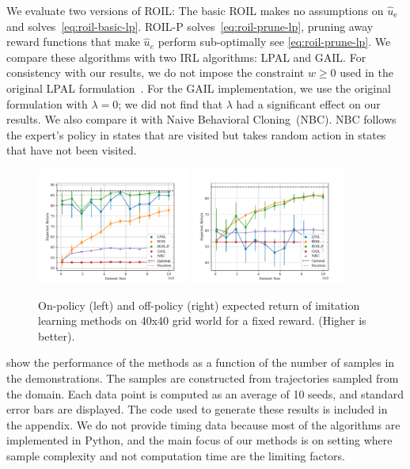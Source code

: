 \documentclass[10pt]{article}
\renewcommand{\cite}{\citep}
\theoremstyle{plain}
\theoremstyle{remark}
\begin{document}

We evaluate two versions of ROIL: The basic ROIL makes no assumptions on $\hat{u}_{\mathrm{e}}$ and solves~\eqref{eq:roil-basic-lp}. ROIL-P solves~\eqref{eq:roil-prune-lp}, pruning away reward functions that make $\hat{u}_e$ perform sub-optimally see \cref{eq:roil-prune-lp}. We compare these algorithms with two IRL algorithms: LPAL and GAIL. For consistency with our results, we do not impose the constraint $w \ge 0$ used in the original LPAL formulation~\cite{Syed2008}. For the GAIL implementation, we use the original formulation with $\lambda = 0$; we did not find that $\lambda$ had a significant effect on our results. We also compare it with Naive Behavioral Cloning~(NBC). NBC follows the expert's policy in states that are visited but takes random action in states that have not been visited.

\begin{figure}
\centering \includegraphics[width=0.45\textwidth]{../src/plots/returns/40x40_gridworld_on_policy_returns.pdf} \includegraphics[width=0.45\textwidth]{../src/plots/returns/40x40_gridworld_off_policy_returns.pdf}
\caption{On-policy (left) and off-policy (right) expected return of imitation learning methods on 40x40 grid world for a fixed reward. (Higher is better).}
\label{fig:grid-40}
\end{figure}

 show the performance of the methods as a function of the number of samples in the demonstrations. The samples are constructed from trajectories sampled from the domain. Each data point is computed as an average of 10 seeds, and standard error bars are displayed. The code used to generate these results is included in the appendix. We do not provide timing data because most of the algorithms are implemented in Python, and the main focus of our methods is on setting where sample complexity and not computation time are the limiting factors. 
\end{document}
